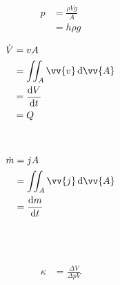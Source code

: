 \begin{boxleft}
\\
\\
\\
\\
\end{boxleft}\begin{boxrightshaded}
\begin{align}
p&=\frac{\rho V g}{A}\\
&=h\rho g
\end{align}
\end{boxrightshaded}

\begin{boxleft}
\end{boxleft}\begin{boxrightshaded}
\begin{align}
\dot{V}&=v A\\
&=\iint_A \vv{v} \diff\vv{ A}\\
&=\frac{\diff V}{\diff t}\\
&=Q
\end{align}
\end{boxrightshaded}

\begin{boxleft}
\\
\end{boxleft}\begin{boxrightshaded}
\begin{align}
\dot{m}&=jA\\
&=\iint_A \vv{j} \diff\vv{A}\\
&=\frac{\diff m}{\diff t}
\end{align}
\end{boxrightshaded}

\begin{boxleft}
\\
\\
\end{boxleft}\begin{boxrightshaded}
\begin{align}
\kappa&=\frac{\Delta V}{\Delta p V}
\end{align}
\end{boxrightshaded}

